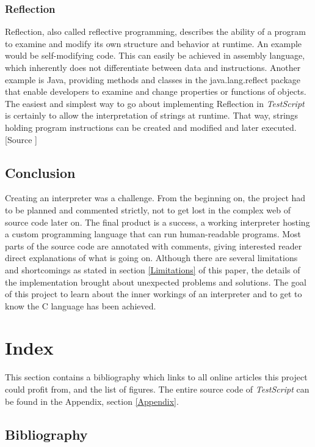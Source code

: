 \documentclass[12pt,a4paper]{article}
\newcommand{\name}{\emph{TestScript}}
\newcommand{\pagelabel}[1]{\phantomsection\label{#1}}
\begin{document}
\subsubsection{Reflection}
Reflection, also called reflective programming, describes
the ability of a program to examine and modify its own structure and behavior 
at runtime. An example would be self-modifying code. This can easily be
achieved in assembly language, which inherently does not differentiate between
data and instructions.
Another example is Java, providing methods and classes in the java.lang.reflect
package that enable developers to examine and change properties or functions
of objects.
The easiest and simplest way to go about implementing Reflection in \name{} is
certainly to allow the interpretation of strings at runtime. That way, strings
holding program instructions can be created and modified and later executed.
[Source ]

\subsection{Conclusion}
Creating an interpreter was a challenge. From the beginning on, the project
had to be planned and commented strictly, not to get lost in the complex web
of source code later on. The final product is a success, a working interpreter
hosting a custom programming language that can run human-readable programs.
Most parts of the source code are annotated with comments, giving interested
reader direct explanations of what is going on.
Although there are several limitations and shortcomings as stated in section \ref{Limitations}
of this paper, the details of the implementation brought about unexpected 
problems and solutions. The goal of this project to learn about 
the inner workings of an interpreter and
to get to know the C language has been achieved.


\section{Index}
This section contains a bibliography which links to all online articles
this project could profit from, and the list of figures.
The entire source code of \name{} can be found in the Appendix, section \ref{Appendix}.

\subsection{Bibliography}
\renewcommand*{\bibfont}{\normalsize}
\pagelabel{bibliography}\printbibliography[heading=none]
\end{document}
